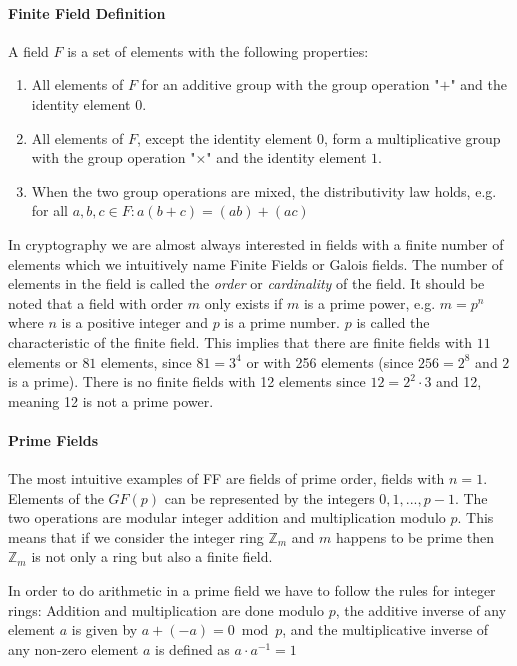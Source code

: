 \paragraph{Finite Field Definition}

A field $F$ is a set of elements with the following properties:

\begin{enumerate}
\item{All elements of $F$ for an additive group with the group operation "$+$" and the identity element $0$.}
\item{All elements of $F$, except the identity element $0$, form a multiplicative group with the group operation "$\times$" and the identity element $1$.}
\item{When the two group operations are mixed, the distributivity law holds, e.g. for all $a,b,c \in F : a(b + c) = (ab) + (ac)$} 
\end{enumerate}

In cryptography we are almost always interested in fields with a finite number of elements which we intuitively name Finite Fields or Galois fields. The number of elements in the field is called the \textit{order} or \textit{cardinality} of the field. It should be noted that a field with order $m$ only exists if $m$ is a prime power, e.g. $m = p^n$ where $n$ is a positive integer and $p$ is a prime number. $p$ is called the characteristic of the finite field. This implies that there are finite fields with $11$ elements or $81$ elements, since $81 = 3^4$ or with 256 elements (since $256 = 2^8$ and $2$ is a prime). There is no finite fields with 12 elements since $12 = 2^2 \cdot 3$ and 12, meaning 12 is not a prime power.

\paragraph{Prime Fields}

The most intuitive examples of FF are fields of prime order, fields with $n=1$. Elements of the $GF(p)$ can be represented by the integers $0,1,...,p-1$. The two operations are modular integer addition and multiplication modulo $p$. This means that if we consider the integer ring $\mathbb{Z}_m$ and $m$ happens to be prime then $\mathbb{Z}_m$ is not only a ring but also a finite field.

In order to do arithmetic in a prime field we have to follow the rules for integer rings:  Addition and multiplication are done modulo $p$, the additive inverse of any element $a$ is given by $a + (-a) = 0 \bmod p$, and the multiplicative inverse of any non-zero element $a$ is defined as $a \cdot a^{-1} = 1$ 

